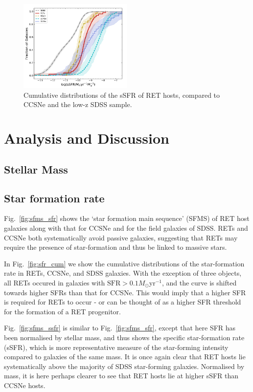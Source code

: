 \documentclass[fleqn,usenatbib,]{mnras}
\newcommand{\msun}[0]{M_{\odot}}
\begin{document}
\begin{figure}
\includegraphics[width=0.5\textwidth]{figs/cum_sSFR_mike.png}
\caption{Cumulative distributions of the sSFR of RET hosts, compared to CCSNe and the low-z SDSS sample.
\label{fig:ssfr_cum}}
\end{figure}


\section{Analysis and Discussion}
\label{sec:analysis} %



\subsection{Stellar Mass \label{subsec:res_mass}}

\subsection{Star formation rate \label{subsec:res_sfr}}
Fig.~\ref{fig:sfms_sfr} shows the `star formation main sequence' (SFMS) of RET host galaxies along with that for CCSNe and for the field galaxies of SDSS. RETs and CCSNe both systematically avoid passive galaxies, suggesting that RETs may require the presence of star-formation and thus be linked to massive stars.

In Fig.~\ref{fig:sfr_cum} we show the cumulative distributions of the star-formation rate in RETs, CCSNe, and SDSS galaxies. With the exception of three objects, all RETs occured in galaxies with $\textrm{SFR}>0.1 \msun$yr$^{-1}$, and the curve is shifted towards higher SFRs than that for CCSNe. This would imply that a higher SFR is required for RETs to occur - or can be thought of as a higher SFR threshold for the formation of a RET progenitor.

Fig.~\ref{fig:sfms_ssfr} is similar to Fig.~\ref{fig:sfms_sfr}, except that here SFR has been normalised by stellar mass, and thus shows the specific star-formation rate (sSFR), which is more representative measure of the star-forming intensity compared to galaxies of the same mass. It is once again clear that RET hosts lie systematically above the majority of SDSS star-forming galaxies. Normalised by mass, it is here perhaps clearer to see that RET hosts lie at higher sSFR than CCSNe hosts.
\end{document}
